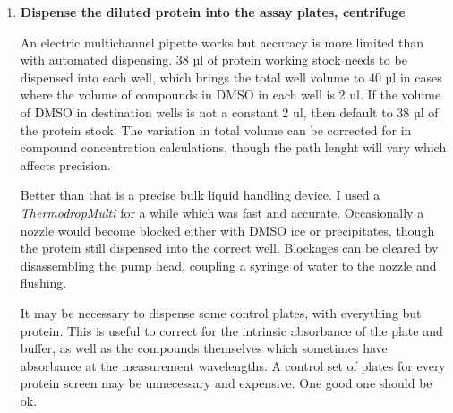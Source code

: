 \documentclass{article}
\begin{document}
\begin{enumerate}
%
%
%

\item \textbf{Dispense the diluted protein into the assay plates, centrifuge}

	An electric multichannel pipette works but accuracy is more limited than with automated dispensing. 
	38 µl of protein working stock needs to be dispensed into each well, which brings the total well volume to 40 µl in cases where the volume of compounds in DMSO in each well is 2 ul.
	If the volume of DMSO in destination wells is not a constant 2 ul, then default to 38 µl of the protein stock.
	The variation in total volume can be corrected for in compound concentration calculations, though the path lenght will vary which affects precision.

	Better than that is a precise bulk liquid handling device.
	I used a \textit{ThermodropMulti} for a while which was fast and accurate.
	Occasionally a nozzle would become blocked either with DMSO ice or precipitates, though the protein still dispensed into the correct well.
	Blockages can be cleared by disassembling the pump head, coupling a syringe of water to the nozzle and flushing.

	It may be necessary to dispense some control plates, with everything but protein.
	This is useful to correct for the intrinsic absorbance of the plate and buffer, as well as the compounds themselves which sometimes have absorbance at the measurement wavelengths.
	A control set of plates for every protein screen may be unnecessary and expensive. 
	One good one should be ok.


\end{enumerate}
\end{document}
